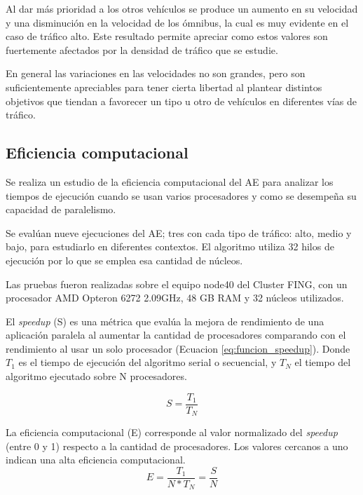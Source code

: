 Al dar más prioridad a los otros vehículos se produce un aumento en su velocidad y una disminución en la velocidad de los ómnibus, la cual es muy evidente en el caso de tráfico alto. Este resultado permite apreciar como estos valores son fuertemente afectados por la densidad de tráfico que se estudie.

En general las variaciones en las velocidades no son grandes, pero son suficientemente apreciables para tener cierta libertad al plantear distintos objetivos que tiendan a favorecer un tipo u otro de vehículos en diferentes vías de tráfico.


\subsection{Eficiencia computacional}

Se realiza un estudio de la eficiencia computacional del AE para analizar los tiempos de ejecución cuando se usan varios procesadores y como se desempeña su capacidad de paralelismo.

Se evalúan nueve ejecuciones del AE; tres con cada tipo de tráfico: alto, medio y bajo, para estudiarlo en diferentes contextos. El algoritmo utiliza 32 hilos de ejecución por lo que se emplea esa cantidad de núcleos.

Las pruebas fueron realizadas sobre el equipo node40 del Cluster FING, con un procesador AMD Opteron 6272 2.09GHz, 48 GB RAM y 32 núcleos utilizados.

El \emph{speedup} (S) es una métrica que evalúa la mejora de rendimiento de una aplicación paralela al aumentar la cantidad de procesadores comparando con el rendimiento al usar un solo procesador (Ecuacion \ref{eq:funcion_speedup}). Donde ${T_1}$ es el tiempo de ejecución del algoritmo serial o secuencial, y ${T_N}$ el tiempo del algoritmo ejecutado sobre N procesadores.

\begin{equation}
\label{eq:funcion_speedup}
S = \frac{T_1}{T_N}
\end{equation}



La eficiencia computacional (E) corresponde al valor normalizado del \emph{speedup} (entre 0 y 1) respecto a la cantidad de procesadores. Los valores cercanos a uno indican una alta eficiencia computacional.
\begin{equation}
\label{eq:funcion_eficiencia}
E = \frac{T_1}{N*T_N} = \frac{S}{N}
\end{equation}

